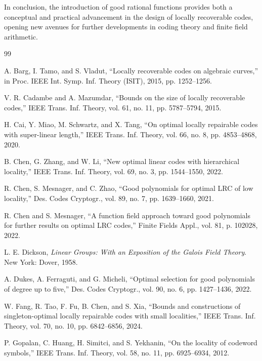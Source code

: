 \documentclass[1p,final]{elsarticle}
\newtheorem{open problem}[theorem]{Open Problem}
\begin{document}
\medskip

\noindent
In conclusion, the introduction of good rational functions provides both a conceptual and practical advancement in the design of locally recoverable codes, opening new avenues for further developments in coding theory and finite field arithmetic.
 


	
\begin{thebibliography}{99}

A. Barg, I. Tamo, and S. Vladut,
``Locally recoverable codes on algebraic curves,''
in Proc. IEEE Int. Symp. Inf. Theory (ISIT), 2015, pp. 1252--1256.

V. R. Cadambe and A. Mazumdar,
``Bounds on the size of locally recoverable codes,''
IEEE Trans. Inf. Theory, vol. 61, no. 11, pp. 5787--5794, 2015.

H. Cai, Y. Miao, M. Schwartz, and X. Tang,
``On optimal locally repairable codes with super-linear length,''
IEEE Trans. Inf. Theory, vol. 66, no. 8, pp. 4853--4868, 2020.

B. Chen, G. Zhang, and W. Li,
``New optimal linear codes with hierarchical locality,''
IEEE Trans. Inf. Theory, vol. 69, no. 3, pp. 1544--1550, 2022.

R. Chen, S. Mesnager, and C. Zhao,
``Good polynomials for optimal LRC of low locality,''
Des. Codes Cryptogr., vol. 89, no. 7, pp. 1639--1660, 2021.

R. Chen and S. Mesnager,
``A function field approach toward good polynomials for further results on optimal LRC codes,''
Finite Fields Appl., vol. 81, p. 102028, 2022.

L. E. Dickson,
\emph{Linear Groups: With an Exposition of the Galois Field Theory}.
New York: Dover, 1958.

A. Dukes, A. Ferraguti, and G. Micheli,
``Optimal selection for good polynomials of degree up to five,''
Des. Codes Cryptogr., vol. 90, no. 6, pp. 1427--1436, 2022.

W. Fang, R. Tao, F. Fu, B. Chen, and S. Xia,
``Bounds and constructions of singleton-optimal locally repairable codes with small localities,''
IEEE Trans. Inf. Theory, vol. 70, no. 10, pp. 6842--6856, 2024.

P. Gopalan, C. Huang, H. Simitci, and S. Yekhanin,
``On the locality of codeword symbols,''
IEEE Trans. Inf. Theory, vol. 58, no. 11, pp. 6925--6934, 2012.


\end{thebibliography}
\end{document}
